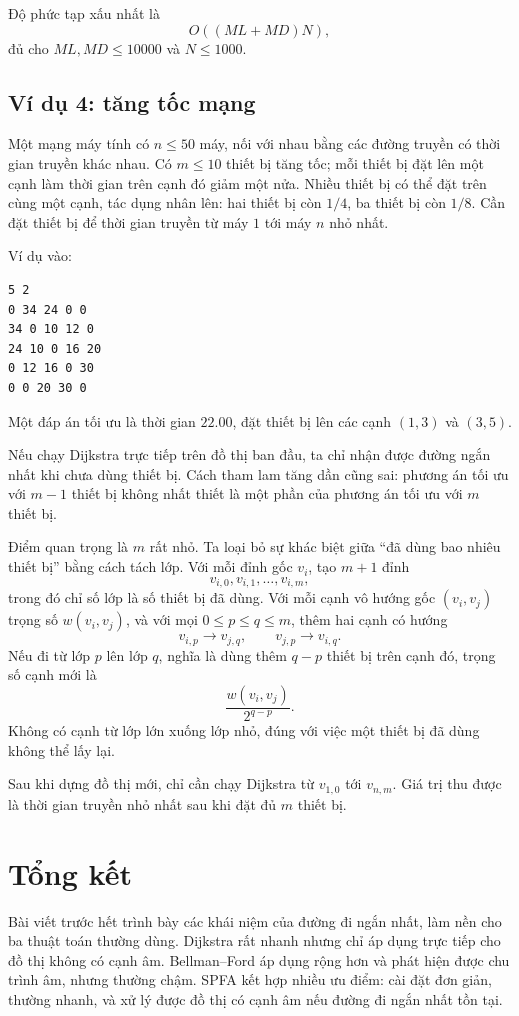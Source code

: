 \documentclass[11pt]{article}
\begin{document}
Độ phức tạp xấu nhất là
\[
  O((ML+MD)N),
\]
đủ cho \(ML,MD\le 10000\) và \(N\le 1000\).

\subsection{Ví dụ 4: tăng tốc mạng}

Một mạng máy tính có \(n\le 50\) máy, nối với nhau bằng các đường truyền có
thời gian truyền khác nhau. Có \(m\le 10\) thiết bị tăng tốc; mỗi thiết bị đặt
lên một cạnh làm thời gian trên cạnh đó giảm một nửa. Nhiều thiết bị có thể
đặt trên cùng một cạnh, tác dụng nhân lên: hai thiết bị còn \(1/4\), ba thiết
bị còn \(1/8\). Cần đặt thiết bị để thời gian truyền từ máy \(1\) tới máy
\(n\) nhỏ nhất.

Ví dụ vào:
\begin{verbatim}
5 2
0 34 24 0 0
34 0 10 12 0
24 10 0 16 20
0 12 16 0 30
0 0 20 30 0
\end{verbatim}
Một đáp án tối ưu là thời gian \(22.00\), đặt thiết bị lên các cạnh
\((1,3)\) và \((3,5)\).

Nếu chạy Dijkstra trực tiếp trên đồ thị ban đầu, ta chỉ nhận được đường ngắn
nhất khi chưa dùng thiết bị. Cách tham lam tăng dần cũng sai: phương án tối ưu
với \(m-1\) thiết bị không nhất thiết là một phần của phương án tối ưu với
\(m\) thiết bị.

Điểm quan trọng là \(m\) rất nhỏ. Ta loại bỏ sự khác biệt giữa ``đã dùng bao
nhiêu thiết bị'' bằng cách tách lớp. Với mỗi đỉnh gốc \(v_i\), tạo
\(m+1\) đỉnh
\[
  v_{i,0},v_{i,1},\ldots,v_{i,m},
\]
trong đó chỉ số lớp là số thiết bị đã dùng. Với mỗi cạnh vô hướng gốc
\((v_i,v_j)\) trọng số \(w(v_i,v_j)\), và với mọi \(0\le p\le q\le m\), thêm
hai cạnh có hướng
\[
  v_{i,p}\to v_{j,q},\qquad v_{j,p}\to v_{i,q}.
\]
Nếu đi từ lớp \(p\) lên lớp \(q\), nghĩa là dùng thêm \(q-p\) thiết bị trên
cạnh đó, trọng số cạnh mới là
\[
  \frac{w(v_i,v_j)}{2^{q-p}}.
\]
Không có cạnh từ lớp lớn xuống lớp nhỏ, đúng với việc một thiết bị đã dùng
không thể lấy lại.

Sau khi dựng đồ thị mới, chỉ cần chạy Dijkstra từ \(v_{1,0}\) tới
\(v_{n,m}\). Giá trị thu được là thời gian truyền nhỏ nhất sau khi đặt đủ
\(m\) thiết bị.

\section{Tổng kết}

Bài viết trước hết trình bày các khái niệm của đường đi ngắn nhất, làm nền
cho ba thuật toán thường dùng. Dijkstra rất nhanh nhưng chỉ áp dụng trực tiếp
cho đồ thị không có cạnh âm. Bellman--Ford áp dụng rộng hơn và phát hiện được
chu trình âm, nhưng thường chậm. SPFA kết hợp nhiều ưu điểm: cài đặt đơn giản,
thường nhanh, và xử lý được đồ thị có cạnh âm nếu đường đi ngắn nhất tồn tại.
\end{document}
